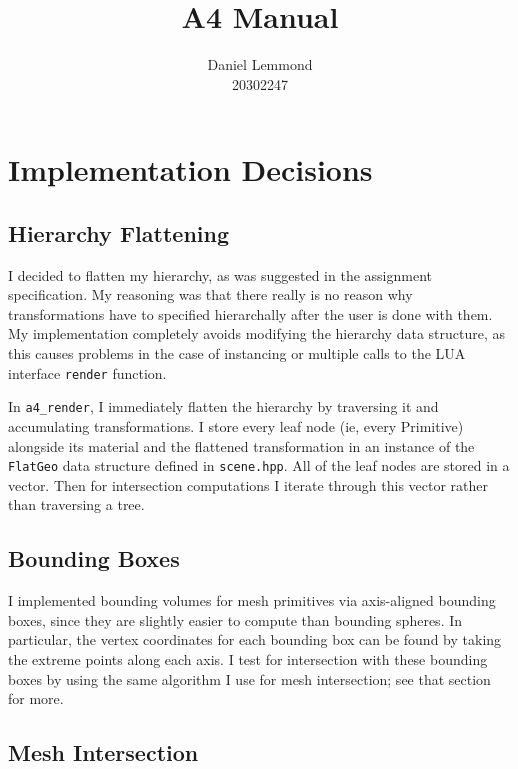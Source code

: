 \documentclass{article}
\begin{document}
\title{A4 Manual}
\author{Daniel Lemmond\\
20302247}

\maketitle

\section{Implementation Decisions}

\subsection{Hierarchy Flattening}

I decided to flatten my hierarchy, as was suggested in the assignment specification. My reasoning was that there really is no reason why transformations have to specified hierarchally after the user is done with them. My implementation completely avoids modifying the hierarchy data structure, as this causes problems in the case of instancing or multiple calls to the LUA interface {\tt render} function.

In {\tt a4\_render}, I immediately flatten the hierarchy by traversing it and accumulating transformations. I store every leaf node (ie, every Primitive) alongside its material and the flattened transformation in an instance of the {\tt FlatGeo} data structure defined in {\tt scene.hpp}. All of the leaf nodes are stored in a vector. Then for intersection computations I iterate through this vector rather than traversing a tree.

\subsection{Bounding Boxes}

I implemented bounding volumes for mesh primitives via axis-aligned bounding
boxes, since they are slightly easier to compute than bounding spheres. In
particular, the vertex coordinates for each bounding box can be found by taking
the extreme points along each axis. I test for intersection with these bounding
boxes by using the same algorithm I use for mesh intersection; see that section
for more.

\subsection{Mesh Intersection}
\end{document}
